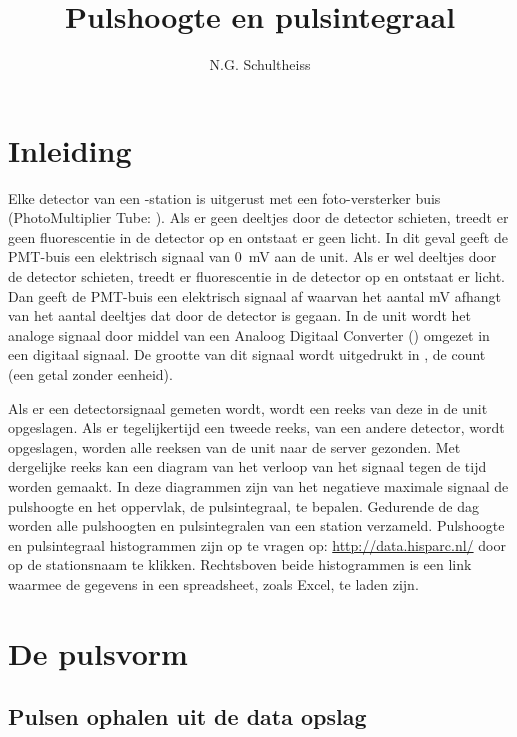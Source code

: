 

\title{Pulshoogte en pulsintegraal}
\author{N.G. Schultheiss}



\maketitle

\section{Inleiding}

Elke detector van een \hisparc-station is uitgerust met een
foto-versterker buis (PhotoMultiplier Tube: \pmt). Als er geen deeltjes
door de detector schieten, treedt er geen fluorescentie in de detector
op en ontstaat er geen licht. In dit geval geeft de PMT-buis een
elektrisch signaal van \SI{0}{\milli\volt} aan de \hisparc unit. Als er
wel deeltjes door de detector schieten, treedt er fluorescentie in de
detector op en ontstaat er licht. Dan geeft de PMT-buis een elektrisch
signaal af waarvan het aantal mV afhangt van het aantal deeltjes dat
door de detector is gegaan. In de \hisparc unit wordt het analoge
signaal door middel van een Analoog Digitaal Converter (\adc) omgezet in
een digitaal signaal. De grootte van dit signaal wordt uitgedrukt in
\adcs, de \adc count (een getal zonder eenheid).

Als er een detectorsignaal gemeten wordt, wordt een reeks van deze \adcs
in de \hisparc unit opgeslagen. Als er tegelijkertijd een tweede reeks,
van een andere detector, wordt opgeslagen, worden alle reeksen \adcs van
de \hisparc unit naar de \hisparc server gezonden. Met dergelijke reeks
kan een diagram van het verloop van het signaal tegen de tijd worden
gemaakt. In deze diagrammen zijn van het negatieve maximale signaal de
pulshoogte en het oppervlak, de pulsintegraal, te bepalen. Gedurende de
dag worden alle pulshoogten en pulsintegralen van een station verzameld.
Pulshoogte en pulsintegraal histogrammen zijn op te vragen op:
\url{http://data.hisparc.nl/} door op de stationsnaam te klikken.
Rechtsboven beide histogrammen is een link waarmee de gegevens in een
spreadsheet, zoals Excel, te laden zijn.


\section{De pulsvorm}


\subsection{Pulsen ophalen uit de \hisparc data opslag}

